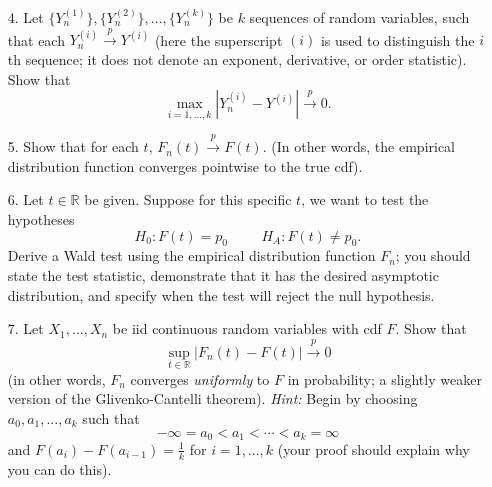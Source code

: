 \documentclass[11pt]{article}
\begin{document}
\begin{enumerate}
\item[4.] Let $\{Y_n^{(1)}\}, \{Y_n^{(2)}\}, ..., \{Y_n^{(k)}\}$ be $k$ sequences of random variables, such that each $Y_n^{(i)} \overset{p}{\to} Y^{(i)}$ (here the superscript $(i)$ is used to distinguish the $i$th sequence; it does not denote an exponent, derivative, or order statistic). Show that
$$\max \limits_{i=1,...,k} |Y_n^{(i)} - Y^{(i)}| \overset{p}{\to} 0.$$

\item[5.] Show that for each $t$, $F_n(t) \overset{p}{\to} F(t)$. (In other words, the empirical distribution function converges pointwise to the true cdf).

\item[6.] Let $t \in \mathbb{R}$ be given. Suppose for this specific $t$, we want to test the hypotheses 
$$H_0: F(t) = p_0 \hspace{1cm} H_A: F(t) \neq p_0.$$
Derive a Wald test using the empirical distribution function $F_n$; you should state the test statistic, demonstrate that it has the desired asymptotic distribution, and specify when the test will reject the null hypothesis.

\item[7.] Let $X_1,...,X_n$ be iid continuous random variables with cdf $F$. Show that 
$$\sup \limits_{t \in \mathbb{R}} |F_n(t) - F(t)| \overset{p}{\to} 0$$
(in other words, $F_n$ converges \textit{uniformly} to $F$ in probability; a slightly weaker version of the Glivenko-Cantelli theorem). \textit{Hint:} Begin by choosing $a_0, a_1,...,a_k$ such that 
$$-\infty = a_0 < a_1 < \cdots < a_k = \infty$$
and $F(a_i) - F(a_{i-1}) = \frac{1}{k}$ for $i = 1,...,k$ (your proof should explain why you can do this).
\end{enumerate}
\end{document}
